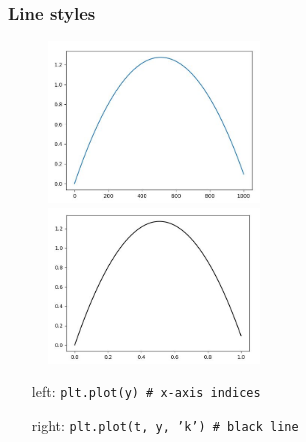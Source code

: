 \documentclass[14pt]{beamer}
\begin{document}
\begin{frame}[fragile]
\frametitle{Line styles}

\begin{figure}[ht]
	\centering
	\includegraphics[width=0.5\textwidth]{figures/LLp23aoutput}%
	\includegraphics[width=0.5\textwidth]{figures/LLp23boutput}
\end{figure}
\vspace*{-8mm}
\begin{itemize}
\item[left:] \texttt{plt.plot(y) \# x-axis indices}
\item[right:] \texttt{plt.plot(t, y, 'k')  \# black line}
\end{itemize}

\end{frame}

\end{document}
